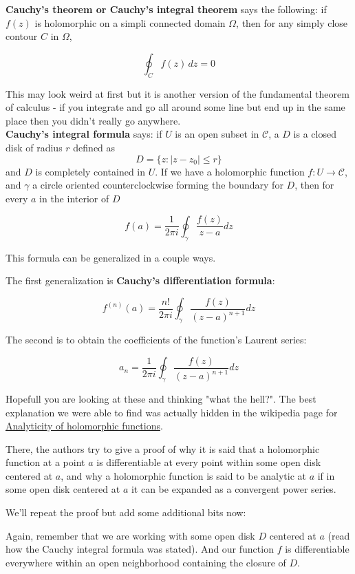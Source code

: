 \textbf{Cauchy's theorem or Cauchy's integral theorem} says the following:
if $f(z)$ is holomorphic on a simpli connected domain $\Omega$, then for any simply close contour $C$
in $\Omega$,

$$
\oint_C f(z) \, dz = 0
$$

This may look weird at first but it is another version of the fundamental theorem of calculus -
if you integrate and go all around some line but end up in the same place then you didn't really go
anywhere.
\\

\textbf{Cauchy's integral formula} says:
if $U$ is an open subset in $\mathcal{C}$, a $D$ is a closed disk of radius $r$ defined as
$$
D = \{ z : |z - z_0| \leq r \}
$$
and $D$ is completely contained in $U$.
If we have a holomorphic function $f : U \rightarrow \mathcal{C}$, and $\gamma$ a circle oriented
counterclockwise forming the boundary for $D$,
then for every $a$ in the interior of $D$

$$
f(a) = \frac{1}{2\pi i} \oint_\gamma \frac{f(z)}{z-a} dz
$$

This formula can be generalized in a couple ways.

The first generalization is \textbf{Cauchy's differentiation formula}:

$$
f^{\left(n\right)}(a) = \frac{n!}{2\pi i} \oint_\gamma \frac{f(z)}{\left(z-a\right)^{n+1}} dz
$$

The second is to obtain the coefficients of the function's Laurent series:

$$
a_n = \frac{1}{2\pi i} \oint_\gamma \frac{f(z)}{\left(z-a\right)^{n+1}} dz
$$

Hopefull you are looking at these and thinking "what the hell?".
The best explanation we were able to find was actually hidden in the wikipedia page for
\href{https://en.wikipedia.org/wiki/Analyticity_of_holomorphic_functions}{Analyticity of holomorphic functions}.

There, the authors try to give a proof of why
it is said that a holomorphic function at a point $a$ is differentiable at every point within
some open disk centered at $a$, and why
a holomorphic function is said to be analytic at $a$ if in some open disk centered at $a$
it can be expanded as a convergent power series.

We'll repeat the proof but add some additional bits now:

Again, remember that we are working with some open disk $D$ centered at $a$ (read how the Cauchy integral formula was stated).
And our function $f$ is differentiable everywhere within an open neighborhood containing the closure of $D$.

